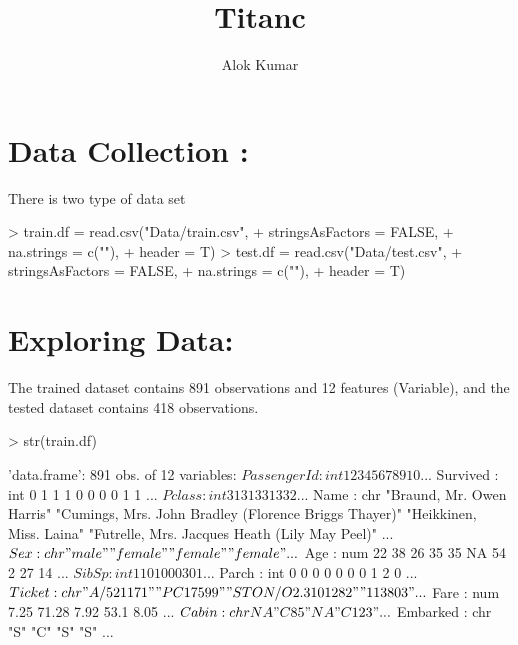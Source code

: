 \documentclass[12pt]{article}
\author{Alok Kumar}
\title{Titanc}
\begin{document}


  \maketitle

\section*{Data Collection :}
There is two type of data set 


\begin{Schunk}
\begin{Sinput}
> train.df = read.csv("Data/train.csv", 
+                     stringsAsFactors = FALSE, 
+                     na.strings = c(""), 
+                     header = T)  
> test.df = read.csv("Data/test.csv", 
+                    stringsAsFactors = FALSE, 
+                    na.strings = c(""), 
+                    header = T)
\end{Sinput}
\end{Schunk}

\section*{Exploring Data:}

The trained dataset contains 891 observations and 12 features (Variable), and the tested dataset contains 418 observations.

\begin{Schunk}
\begin{Sinput}
> str(train.df)
\end{Sinput}
\begin{Soutput}
'data.frame':	891 obs. of  12 variables:
 $ PassengerId: int  1 2 3 4 5 6 7 8 9 10 ...
 $ Survived   : int  0 1 1 1 0 0 0 0 1 1 ...
 $ Pclass     : int  3 1 3 1 3 3 1 3 3 2 ...
 $ Name       : chr  "Braund, Mr. Owen Harris" "Cumings, Mrs. John Bradley (Florence Briggs Thayer)" "Heikkinen, Miss. Laina" "Futrelle, Mrs. Jacques Heath (Lily May Peel)" ...
 $ Sex        : chr  "male" "female" "female" "female" ...
 $ Age        : num  22 38 26 35 35 NA 54 2 27 14 ...
 $ SibSp      : int  1 1 0 1 0 0 0 3 0 1 ...
 $ Parch      : int  0 0 0 0 0 0 0 1 2 0 ...
 $ Ticket     : chr  "A/5 21171" "PC 17599" "STON/O2. 3101282" "113803" ...
 $ Fare       : num  7.25 71.28 7.92 53.1 8.05 ...
 $ Cabin      : chr  NA "C85" NA "C123" ...
 $ Embarked   : chr  "S" "C" "S" "S" ...
\end{Soutput}
\end{Schunk}
\end{document}
